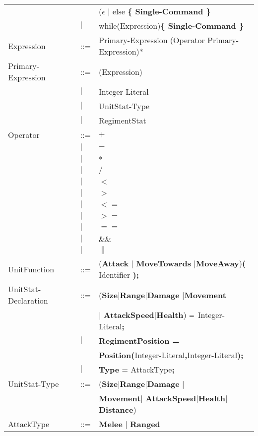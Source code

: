 \begin{center}
\begin{longtable}{ l l l }
									&		&($\epsilon$ $\mid$ else \bf{\{ }Single-Command \bf{\} }\\					   
									&$\mid$	&while(Expression)\bf{\{ } Single-Command \bf{\}}\\
		Expression					&	::=	&Primary-Expression (Operator Primary-Expression)*\\
		Primary-Expression			&	::=	&(Expression)\\
									&$\mid$	&Integer-Literal \\
									&$\mid$	&UnitStat-Type\\
									&$\mid$	&RegimentStat \\	
		Operator					&	::=	&$\boldsymbol {+}$\\
									&$\mid$	&$\boldsymbol {-}$\\
									&$\mid$	&$\boldsymbol {*}$\\
									&$\mid$	&$\boldsymbol {/}$\\
									&$\mid$	&$\boldsymbol {<}$\\
									&$\mid$	&$\boldsymbol {>}$\\
									&$\mid$	&$\boldsymbol {<=}$\\
									&$\mid$	&$\boldsymbol {>=}$\\
									&$\mid$	&$\boldsymbol {==}$\\
									&$\mid$	&$\boldsymbol {\&\&}$\\
									&$\mid$	&$\boldsymbol {\|}$\\
		UnitFunction				&	::=	&({\bf Attack} $\mid$ {\bf MoveTowards} $\mid${\bf MoveAway}){\bf (} Identifier {\bf );}\\
		UnitStat-Declaration		&	::=	&({\bf Size}$\mid${\bf Range}$\mid${\bf Damage} $\mid${\bf Movement}\\ 
									&		&$\mid$ {\bf AttackSpeed}$\mid${\bf Health}) ${\bf = }$ Integer-Literal{\bf ;} \\
									&$\mid$	&{\bf RegimentPosition =} \\
									&		&{\bf Position(}Integer-Literal{\bf ,}Integer-Literal{\bf );}\\
									&$\mid$	&{\bf Type} = AttackType{\bf ;}\\
		UnitStat-Type				&	::=	&({\bf Size}$\mid${\bf Range}$\mid${\bf Damage} $\mid$\\
									&		&{\bf Movement}$\mid$ {\bf AttackSpeed}$\mid${\bf Health}$\mid${\bf Distance})\\ 
		AttackType					&	::=	&{\bf Melee} $\mid$ {\bf Ranged} \\

\end{longtable}
\end{center}
